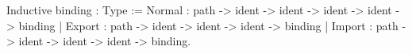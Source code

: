 Inductive binding : Type :=
    Normal : path -> ident -> ident -> ident -> ident -> binding
  | Export : path -> ident -> ident -> ident -> binding
  | Import : path -> ident -> ident -> ident -> binding.